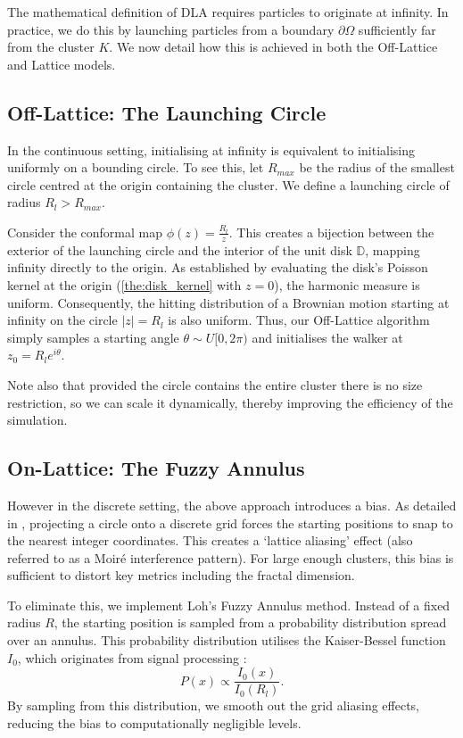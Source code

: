 \documentclass[12pt, a4paper, oneside]{report}
\theoremstyle{remark}
\begin{document}
The mathematical definition of DLA requires particles to originate at infinity. In practice, we do this by launching particles from a boundary $\partial \Omega$ sufficiently far from the cluster $K$. We now detail how this is achieved in both the Off-Lattice and Lattice models.
\subsection{Off-Lattice: The Launching Circle}
In the continuous setting, initialising at infinity is equivalent to initialising uniformly on a bounding circle.
To see this, let $R_{max}$ be the radius of the smallest circle centred at the origin containing the cluster. We define a launching circle of radius $R_{l} > R_{max}$.

Consider the conformal map $\phi(z) = \frac{R_{l}}{z}$. This creates a bijection between the exterior of the launching circle and the interior of the unit disk $\mathbb{D}$, mapping infinity directly to the origin. As established by evaluating the disk's Poisson kernel at the origin (\cref{the:disk_kernel} with $z=0$), the harmonic measure is uniform. Consequently, the hitting distribution of a Brownian motion starting at infinity on the circle $|z|=R_{l}$ is also uniform.
Thus, our Off-Lattice algorithm simply samples a starting angle $\theta \sim U[0, 2\pi)$ and initialises the walker at $z_0 = R_{l}e^{i\theta}$. 

Note also that provided the circle contains the entire cluster there is no size restriction, so we can scale it dynamically, thereby improving the efficiency of the simulation.

\subsection{On-Lattice: The Fuzzy Annulus}
However in the discrete setting, the above approach introduces a bias. As detailed in \cite{Loh2014}, projecting a circle onto a discrete grid forces the starting positions to snap to the nearest integer coordinates. This creates a `lattice aliasing' effect (also referred to as a Moir\'e interference pattern). For large enough clusters, this bias is sufficient to distort key metrics including the fractal dimension.

To eliminate this, we implement Loh's Fuzzy Annulus method. Instead of a fixed radius $R$, the starting position is sampled from a probability distribution spread over an annulus. This probability distribution utilises the Kaiser-Bessel function $I_0$, which originates from signal processing \cite{kaiser1980}:
\begin{equation*}
    P(x) \propto \frac{I_0(x)}{I_0(R_{l})}.
\end{equation*}
By sampling from this distribution, we smooth out the grid aliasing effects, reducing the bias to computationally negligible levels.
\end{document}
